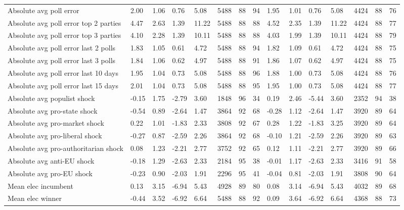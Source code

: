 \begin{longtable}{lllllllllllllll}
Absolute avg poll error & 2.00 & 1.06 & 0.76 & 5.08 & 5488 & 88 & 94 & 1.95 & 1.01 & 0.76 & 5.08 & 4424 & 88 & 76\\
Absolute avg poll error top 2 parties & 4.47 & 2.63 & 1.39 & 11.22 & 5488 & 88 & 88 & 4.52 & 2.35 & 1.39 & 11.22 & 4424 & 88 & 77\\
Absolute avg poll error top 3 parties & 4.10 & 2.28 & 1.39 & 10.11 & 5488 & 88 & 88 & 4.03 & 1.99 & 1.39 & 10.11 & 4424 & 88 & 79\\
\addlinespace
Absolute avg poll error last 2 polls & 1.83 & 1.05 & 0.61 & 4.72 & 5488 & 88 & 94 & 1.82 & 1.09 & 0.61 & 4.72 & 4424 & 88 & 75\\
Absolute avg poll error last 3 polls & 1.84 & 1.06 & 0.62 & 4.97 & 5488 & 88 & 91 & 1.86 & 1.07 & 0.62 & 4.97 & 4424 & 88 & 75\\
Absolute avg poll error last 10 days & 1.95 & 1.04 & 0.73 & 5.08 & 5488 & 88 & 96 & 1.88 & 1.00 & 0.73 & 5.08 & 4424 & 88 & 76\\
Absolute avg poll error last 15 days & 2.01 & 1.04 & 0.73 & 5.08 & 5488 & 88 & 95 & 1.95 & 1.00 & 0.73 & 5.08 & 4424 & 88 & 77\\
Absolute avg populist shock & -0.15 & 1.75 & -2.79 & 3.60 & 1848 & 96 & 34 & 0.19 & 2.46 & -5.44 & 3.60 & 2352 & 94 & 38\\
\addlinespace
Absolute avg pro-state shock & -0.54 & 0.89 & -2.64 & 1.47 & 3864 & 92 & 68 & -0.28 & 1.12 & -2.64 & 1.47 & 3920 & 89 & 64\\
Absolute avg pro-market shock & 0.22 & 1.01 & -1.83 & 2.33 & 3808 & 92 & 67 & 0.28 & 1.22 & -1.83 & 3.25 & 3920 & 89 & 64\\
Absolute avg pro-liberal shock & -0.27 & 0.87 & -2.59 & 2.26 & 3864 & 92 & 68 & -0.10 & 1.21 & -2.59 & 2.26 & 3920 & 89 & 63\\
Absolute avg pro-authoritarian shock & 0.08 & 1.23 & -2.21 & 2.77 & 3752 & 92 & 65 & 0.12 & 1.11 & -2.21 & 2.77 & 3920 & 89 & 66\\
Absolute avg anti-EU shock & -0.18 & 1.29 & -2.63 & 2.33 & 2184 & 95 & 38 & -0.01 & 1.17 & -2.63 & 2.33 & 3416 & 91 & 58\\
\addlinespace
Absolute avg pro-EU shock & -0.23 & 0.90 & -2.03 & 1.91 & 2296 & 95 & 41 & -0.04 & 0.81 & -2.03 & 1.91 & 3808 & 90 & 64\\
Mean elec incumbent & 0.13 & 3.15 & -6.94 & 5.43 & 4928 & 89 & 80 & 0.08 & 3.14 & -6.94 & 5.43 & 4032 & 89 & 68\\
Mean elec winner & -0.44 & 3.52 & -6.92 & 6.64 & 5488 & 88 & 92 & 0.09 & 3.64 & -6.92 & 6.64 & 4368 & 88 & 73\\

\end{longtable}
